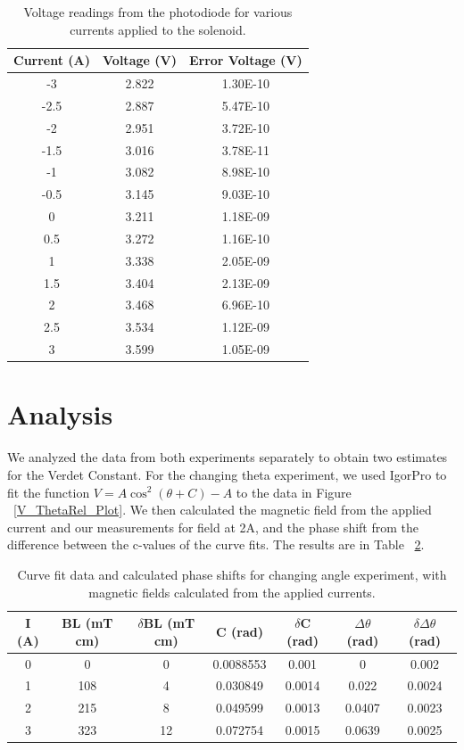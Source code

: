 \documentclass[prb,preprint]{revtex4-1}
\begin{document}
\begin{table}[h!]
\centering
\caption{Voltage readings from the photodiode for various currents applied to the solenoid. }
\begin{ruledtabular}
\begin{tabular}{c c c}
Current (A) & Voltage (V) & Error Voltage (V)\\
\hline	%
-3   & 2.822 & 1.30E-10 \\
-2.5 & 2.887 & 5.47E-10 \\
-2   & 2.951 & 3.72E-10 \\
-1.5 & 3.016 & 3.78E-11 \\
-1   & 3.082 & 8.98E-10 \\
-0.5 & 3.145 & 9.03E-10 \\
0    & 3.211 & 1.18E-09 \\
0.5  & 3.272 & 1.16E-10 \\
1    & 3.338 & 2.05E-09 \\
1.5  & 3.404 & 2.13E-09 \\
2    & 3.468 & 6.96E-10 \\
2.5  & 3.534 & 1.12E-09 \\
3    & 3.599 & 1.05E-09
\end{tabular}
\end{ruledtabular}
\label{V_I_Table}
\end{table}

\section{Analysis}

We analyzed the data from both experiments separately to obtain two estimates for the Verdet Constant.  For the changing theta experiment, we used IgorPro to fit the function $V = A \cos ^2 (\theta + C) - A$ to the data in Figure ~\ref{V_ThetaRel_Plot}.  We then calculated the magnetic field from the applied current and our measurements for field at 2A, and the phase shift from the difference between the c-values of the curve fits.  The results are in Table ~\ref{B*L_PhaseShift_Table}.  

\begin{table}[h!]
\centering
\caption{Curve fit data and calculated phase shifts for changing angle experiment, with magnetic fields calculated from the applied currents.}
\begin{ruledtabular}
\begin{tabular}{c c c c c c c}
I (A) & BL (mT cm) & $\delta$BL (mT cm) & C (rad)& $\delta$C (rad) & $\Delta \theta$ (rad) & $\delta \Delta \theta$ (rad)\\
\hline	%
0 &  0  & 0 &  0.0088553 & 0.001 & 0 & 0.002    \\
1 & 108 & 4  & 0.030849  & 0.0014 & 0.022  & 0.0024 \\
2 & 215 & 8 & 0.049599  & 0.0013 & 0.0407 & 0.0023  \\
3 & 323 & 12 & 0.072754  & 0.0015 & 0.0639 & 0.0025 
\end{tabular}
\end{ruledtabular}
\label{B*L_PhaseShift_Table}
\end{table}
\end{document}
